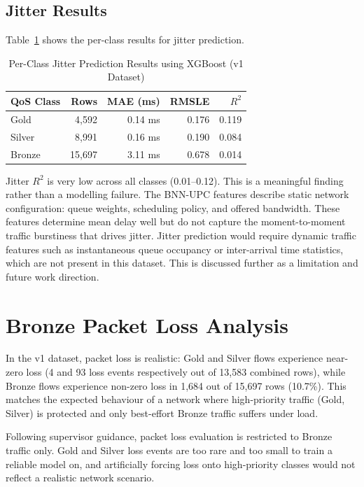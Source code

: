 \documentclass[a4paper,12pt]{Classes/RoboticsLaTeX}
\begin{document}
\subsection{Jitter Results}

Table~\ref{tab:jitter_results} shows the per-class results for jitter prediction.

\begin{table}[H]
\centering
\caption{Per-Class Jitter Prediction Results using XGBoost (v1 Dataset)}
\label{tab:jitter_results}
\begin{tabular}{|l|r|r|r|r|}
\hline
\textbf{QoS Class} & \textbf{Rows} & \textbf{MAE (ms)} & \textbf{RMSLE} & \textbf{$R^2$} \\
\hline
Gold & 4,592 & 0.14 ms & 0.176 & 0.119 \\
\hline
Silver & 8,991 & 0.16 ms & 0.190 & 0.084 \\
\hline
Bronze & 15,697 & 3.11 ms & 0.678 & 0.014 \\
\hline
\end{tabular}
\end{table}

Jitter $R^2$ is very low across all classes (0.01--0.12). This is a meaningful finding rather than a modelling failure. The BNN-UPC features describe static network configuration: queue weights, scheduling policy, and offered bandwidth. These features determine mean delay well but do not capture the moment-to-moment traffic burstiness that drives jitter. Jitter prediction would require dynamic traffic features such as instantaneous queue occupancy or inter-arrival time statistics, which are not present in this dataset. This is discussed further as a limitation and future work direction.

\section{Bronze Packet Loss Analysis}

In the v1 dataset, packet loss is realistic: Gold and Silver flows experience near-zero loss (4 and 93 loss events respectively out of 13,583 combined rows), while Bronze flows experience non-zero loss in 1,684 out of 15,697 rows (10.7\%). This matches the expected behaviour of a network where high-priority traffic (Gold, Silver) is protected and only best-effort Bronze traffic suffers under load.

Following supervisor guidance, packet loss evaluation is restricted to Bronze traffic only. Gold and Silver loss events are too rare and too small to train a reliable model on, and artificially forcing loss onto high-priority classes would not reflect a realistic network scenario.
\end{document}
